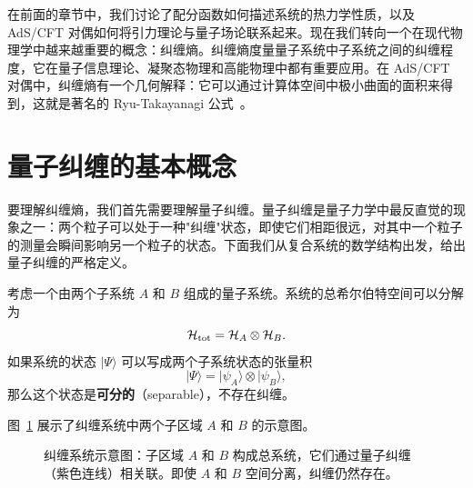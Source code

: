 
在前面的章节中，我们讨论了配分函数如何描述系统的热力学性质，以及 AdS/CFT 对偶如何将引力理论与量子场论联系起来。现在我们转向一个在现代物理学中越来越重要的概念：纠缠熵。纠缠熵度量量子系统中子系统之间的纠缠程度，它在量子信息理论、凝聚态物理和高能物理中都有重要应用。在 AdS/CFT 对偶中，纠缠熵有一个几何解释：它可以通过计算体空间中极小曲面的面积来得到，这就是著名的 Ryu-Takayanagi 公式~\cite{Ryu2006}。

\section{量子纠缠的基本概念}

要理解纠缠熵，我们首先需要理解量子纠缠。量子纠缠是量子力学中最反直觉的现象之一：两个粒子可以处于一种"纠缠"状态，即使它们相距很远，对其中一个粒子的测量会瞬间影响另一个粒子的状态。下面我们从复合系统的数学结构出发，给出量子纠缠的严格定义。

\begin{definition}[复合系统与张量积]
考虑一个由两个子系统 $A$ 和 $B$ 组成的量子系统。系统的总希尔伯特空间可以分解为
\begin{equation}
    \mathcal{H}_{\rm tot} = \mathcal{H}_A \otimes \mathcal{H}_B.
\end{equation}
如果系统的状态 $|\Psi\rangle$ 可以写成两个子系统状态的张量积
\begin{equation}
    |\Psi\rangle = |\psi_A\rangle \otimes |\psi_B\rangle,
\end{equation}
那么这个状态是\textbf{可分的}（separable），不存在纠缠。
\end{definition}

图~\ref{fig:entangled_system} 展示了纠缠系统中两个子区域 $A$ 和 $B$ 的示意图。

\begin{figure}[htbp]
\centering
{}
\caption{纠缠系统示意图：子区域 $A$ 和 $B$ 构成总系统，它们通过量子纠缠（紫色连线）相关联。即使 $A$ 和 $B$ 空间分离，纠缠仍然存在。}
\label{fig:entangled_system}
\end{figure}

